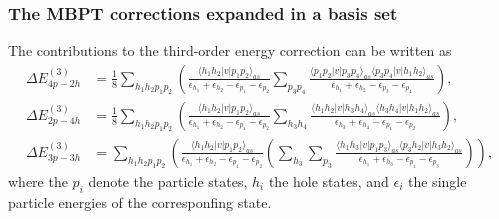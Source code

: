 \documentclass[xcolor=pdftex,hyperref={pdfpagelabels=false},table]{beamer}
\begin{document}
\begin{frame}
\frametitle{The MBPT corrections expanded in a basis set}
\begin{scriptsize}
The contributions to the third-order energy correction can be written as
\begin{align*}
\Delta E^{(3)}_{4p-2h} &= \frac{1}{8} \sum_{h_1 h_2 p_1 p_2}  \left(  \frac{\langle h_1 h_2 |v|p_1 p_2 \rangle_{as}}{\epsilon_{h_1}+\epsilon_{h_2}-\epsilon_{p_1}-\epsilon_{p_2}}  \sum_{p_3 p_4} \frac{\langle p_1 p_2 |v|p_3 p_4 \rangle_{as} \langle p_3 p_4 |v|h_1 h_2 \rangle_{as}}{\epsilon_{h_1}+\epsilon_{h_2}-\epsilon_{p_3}-\epsilon_{p_4}}    \right),\\ \nonumber
\Delta E^{(3)}_{2p-4h} &= \frac{1}{8} \sum_{h_1 h_2 p_1 p_2}  \left(  \frac{\langle h_1 h_2 |v|p_1 p_2 \rangle_{as}}{\epsilon_{h_1}+\epsilon_{h_2}-\epsilon_{p_1}-\epsilon_{p_2}}  \sum_{h_3 h_4} \frac{\langle h_1 h_2 |v|h_3 h_4 \rangle_{as} \langle h_3 h_4 |v|h_1 h_2 \rangle_{as}}{\epsilon_{h_3}+\epsilon_{h_4}-\epsilon_{p_1}-\epsilon_{p_2}}    \right),\\ \nonumber
\Delta E^{(3)}_{3p-3h} &=  \sum_{h_1 h_2 p_1 p_2}  \left(  \frac{\langle h_1 h_2 |v|p_1 p_2 \rangle_{as}}{\epsilon_{h_1}+\epsilon_{h_2}-\epsilon_{p_1}-\epsilon_{p_2}} \left( \sum_{h_3}\sum_{p_3} \frac{\langle h_1 h_3 |v|p_1 p_3 \rangle_{as} \langle p_3 h_2 |v|h_3 h_2 \rangle_{as}}{\epsilon_{h_1}+\epsilon_{h_3}-\epsilon_{p_1}-\epsilon_{p_3}}  \right)  \right),\nonumber
\end{align*}
where the $p_i$ denote the  particle states, $h_i$ the hole states, and $\epsilon_{i}$ the single particle energies of the corresponfing state.
\end{scriptsize}
\end{frame}
\end{document}
